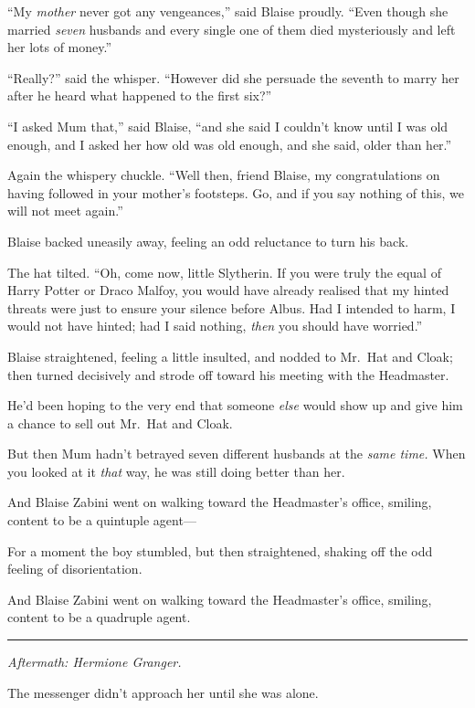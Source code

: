``My \emph{mother} never got any vengeances,'' said Blaise proudly.
``Even though she married \emph{seven} husbands and every single one of
them died mysteriously and left her lots of money.''

``Really?'' said the whisper. ``However did she persuade the seventh to
marry her after he heard what happened to the first six?''

``I asked Mum that,'' said Blaise, ``and she said I couldn't know until
I was old enough, and I asked her how old was old enough, and she said,
older than her.''

Again the whispery chuckle. ``Well then, friend Blaise, my
congratulations on having followed in your mother's footsteps. Go, and
if you say nothing of this, we will not meet again.''

Blaise backed uneasily away, feeling an odd reluctance to turn his back.

The hat tilted. ``Oh, come now, little Slytherin. If you were truly the
equal of Harry Potter or Draco Malfoy, you would have already realised
that my hinted threats were just to ensure your silence before Albus.
Had I intended to harm, I would not have hinted; had I said nothing,
\emph{then} you should have worried.''

Blaise straightened, feeling a little insulted, and nodded to Mr.~Hat
and Cloak; then turned decisively and strode off toward his meeting with
the Headmaster.

He'd been hoping to the very end that someone \emph{else} would show up
and give him a chance to sell out Mr.~Hat and Cloak.

But then Mum hadn't betrayed seven different husbands at the \emph{same
time.} When you looked at it \emph{that} way, he was still doing better
than her.

And Blaise Zabini went on walking toward the Headmaster's office,
smiling, content to be a quintuple agent---

For a moment the boy stumbled, but then straightened, shaking off the
odd feeling of disorientation.

And Blaise Zabini went on walking toward the Headmaster's office,
smiling, content to be a quadruple agent.

\begin{center}\rule{3in}{0.4pt}\end{center}

\emph{Aftermath: Hermione Granger.}

The messenger didn't approach her until she was alone.

